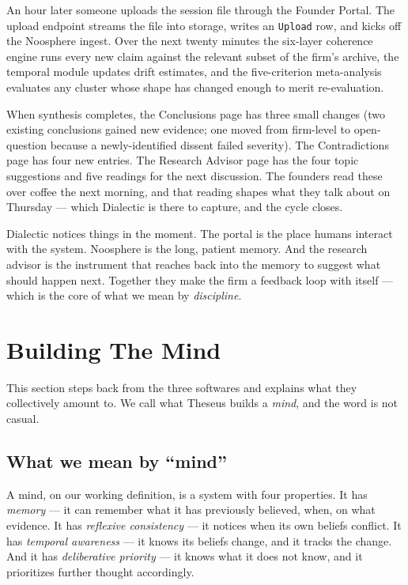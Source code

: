 \documentclass[11pt]{article}
\begin{document}
An hour later someone uploads the session file through the Founder Portal. The upload endpoint streams the file into storage, writes an \texttt{Upload} row, and kicks off the Noosphere ingest. Over the next twenty minutes the six-layer coherence engine runs every new claim against the relevant subset of the firm's archive, the temporal module updates drift estimates, and the five-criterion meta-analysis evaluates any cluster whose shape has changed enough to merit re-evaluation.

When synthesis completes, the Conclusions page has three small changes (two existing conclusions gained new evidence; one moved from firm-level to open-question because a newly-identified dissent failed severity). The Contradictions page has four new entries. The Research Advisor page has the four topic suggestions and five readings for the next discussion. The founders read these over coffee the next morning, and that reading shapes what they talk about on Thursday --- which Dialectic is there to capture, and the cycle closes.

\begin{intuitionbox}
Dialectic notices things in the moment. The portal is the place humans interact with the system. Noosphere is the long, patient memory. And the research advisor is the instrument that reaches back into the memory to suggest what should happen next. Together they make the firm a feedback loop with itself --- which is the core of what we mean by \emph{discipline}.
\end{intuitionbox}

\clearpage

\section{Building The Mind}

This section steps back from the three softwares and explains what they collectively amount to. We call what Theseus builds a \emph{mind}, and the word is not casual.

\subsection{What we mean by ``mind''}

A mind, on our working definition, is a system with four properties. It has \textit{memory} --- it can remember what it has previously believed, when, on what evidence. It has \textit{reflexive consistency} --- it notices when its own beliefs conflict. It has \textit{temporal awareness} --- it knows its beliefs change, and it tracks the change. And it has \textit{deliberative priority} --- it knows what it does not know, and it prioritizes further thought accordingly.
\end{document}
